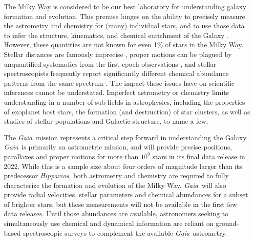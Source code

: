 \documentclass[preprint,trackchanges]{aastex}
\newcommand{\project}[1]{\textsl{#1}}
\newcommand{\gaia}{\project{Gaia}}
\newcommand{\hipparcos}{\project{Hipparcos}}
\begin{document}
The Milky Way is considered to be our best laboratory for understanding galaxy
formation and evolution.  This premise hinges on the ability to precisely measure 
the astrometry and chemistry for (many) individual stars, and to use those data 
to infer the structure, kinematics, and chemical enrichment of the Galaxy 
\citep[e.g.,][]{Nordstrom_2004,Schlaufman_2009,Deason_2011,Casagrande_2011,
Ness_2012,Ness_2013a,Ness_2013b,Casey_2012,Casey_2013,Casey_2014a,Casey_2014b,
Boeche_2013,Kordopatis_2015,Bovy_2016}.  However, these quantities are not known
for even 1\% of stars in the Milky Way.  Stellar distances are famously imprecise 
\citep[e.g.,][]{van_Leeuwen_2007,Jofre_2015,Madler_2016}, proper motions can be
plagued by unquantified systematics from the first epoch observations 
\citep[e.g.,][]{Casey_Schlaufman_2015}, and stellar spectroscopists frequently 
report significantly different chemical abundance patterns from the same spectrum 
\citep{Smiljanic_2014}.  The impact these issues have on scientific inferences 
cannot be understated.  Imperfect astrometry or chemistry limits understanding 
in a number of sub-fields in astrophysics, including the properties of exoplanet 
host stars, the formation (and destruction) of star clusters, as well as studies
of stellar populations and Galactic structure, to name a few.


The \gaia\ mission represents a critical step forward in understanding the Galaxy.
\gaia\ is primarily an astrometric mission, and will provide precise positions,
parallaxes and proper motions for more than $10^9$ stars in its final data
release in 2022.  While this is a sample size about four orders of magnitude 
larger than its predecessor \hipparcos, both astrometry and chemistry are 
required to fully characterize the formation and evolution of the Milky Way. 
\gaia\ will also provide radial velocities, stellar parameters and chemical 
abundances for a subset of brighter stars, but these measurements will not be 
available in the first few data releases. Until those abundances are available,
astronomers seeking to simultaneously use chemical and dynamical information are
reliant on ground-based spectroscopic surveys to complement the available 
\gaia\ astrometry.
\end{document}
